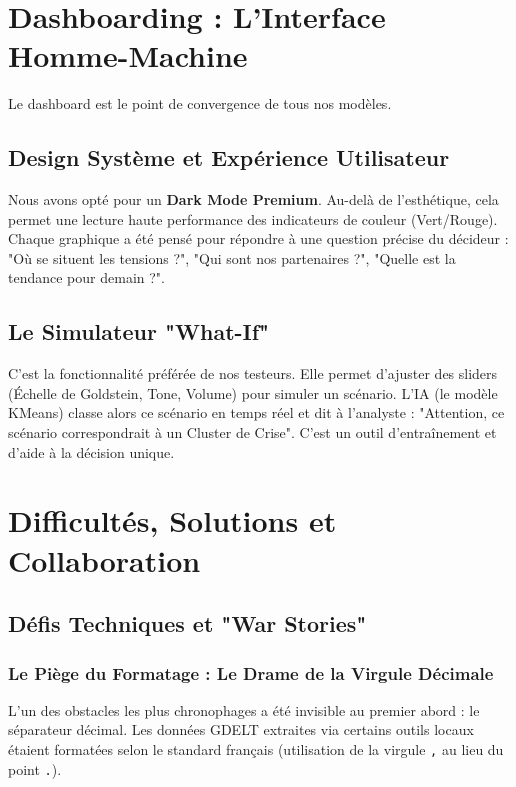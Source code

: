 \documentclass[12pt,a4paper]{article}
\begin{document}
\section{Dashboarding : L'Interface Homme-Machine}
Le dashboard est le point de convergence de tous nos modèles.

\subsection{Design Système et Expérience Utilisateur}
Nous avons opté pour un \textbf{Dark Mode Premium}. Au-delà de l'esthétique, cela permet une lecture haute performance des indicateurs de couleur (Vert/Rouge). Chaque graphique a été pensé pour répondre à une question précise du décideur : "Où se situent les tensions ?", "Qui sont nos partenaires ?", "Quelle est la tendance pour demain ?".

\subsection{Le Simulateur "What-If"}
C'est la fonctionnalité préférée de nos testeurs. Elle permet d'ajuster des sliders (Échelle de Goldstein, Tone, Volume) pour simuler un scénario. L'IA (le modèle KMeans) classe alors ce scénario en temps réel et dit à l'analyste : "Attention, ce scénario correspondrait à un Cluster de Crise". C'est un outil d'entraînement et d'aide à la décision unique.

\section{Difficultés, Solutions et Collaboration}
\subsection{Défis Techniques et "War Stories"}

\subsubsection{Le Piège du Formatage : Le Drame de la Virgule Décimale}
L'un des obstacles les plus chronophages a été invisible au premier abord : le séparateur décimal. Les données GDELT extraites via certains outils locaux étaient formatées selon le standard français (utilisation de la virgule \texttt{,} au lieu du point \texttt{.}). 
\end{document}
